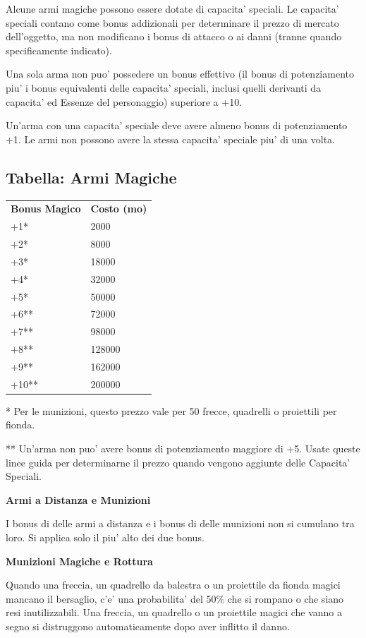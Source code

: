 \documentclass[a4paper,11pt,twoside,openany]{book}
\begin{document}
{		Alcune armi magiche possono essere dotate di capacita' speciali. Le capacita' speciali contano come bonus addizionali per determinare il prezzo di mercato dell'oggetto, ma non modificano i bonus di attacco o ai danni (tranne quando specificamente indicato).
		
		Una sola arma non puo' possedere un bonus effettivo (il bonus di potenziamento piu' i bonus equivalenti delle capacita' speciali, inclusi quelli derivanti da capacita' ed Essenze del personaggio) superiore a +10. 
		
		Un'arma con una capacita' speciale deve avere almeno bonus di potenziamento +1. Le armi non possono avere la stessa capacita' speciale piu' di una volta.
		
		
		
		\subsection{Tabella: Armi Magiche}
		
		\label{tabella-armi-magiche}
		
		\begin{tabular}{ll}
			\toprule
			\textbf{Bonus Magico} & \textbf{Costo (mo)}\tabularnewline
			+1{*} & 2000\tabularnewline
			+2{*} & 8000\tabularnewline
			+3{*} & 18000\tabularnewline
			+4{*} & 32000\tabularnewline
			+5{*} & 50000\tabularnewline
			+6{*}{*} & 72000\tabularnewline
			+7{*}{*} & 98000\tabularnewline
			+8{*}{*} & 128000\tabularnewline
			+9{*}{*} & 162000\tabularnewline
			+10{*}{*} & 200000\tabularnewline
			
		\end{tabular}
		
		{*} Per le munizioni, questo prezzo vale per 50 frecce, quadrelli o proiettili per fionda.
		
		{*}{*} Un'arma non puo' avere bonus di potenziamento maggiore di +5. Usate queste linee guida per determinarne il prezzo quando vengono aggiunte delle Capacita' Speciali.
		
		\bigskip
		
		\textbf{Armi a Distanza e Munizioni}
		
		I bonus di delle armi a distanza e i bonus di delle munizioni non si cumulano tra loro. Si applica solo il piu' alto dei due bonus.
		
		\textbf{Munizioni Magiche e Rottura}
		
		Quando una freccia, un quadrello da balestra o un proiettile da fionda magici mancano il bersaglio, c'e' una probabilita' del 50\% che si rompano o che siano resi inutilizzabili. Una freccia, un quadrello o un proiettile magici che vanno a segno si distruggono automaticamente dopo aver inflitto il danno.
		
}
\end{document}
